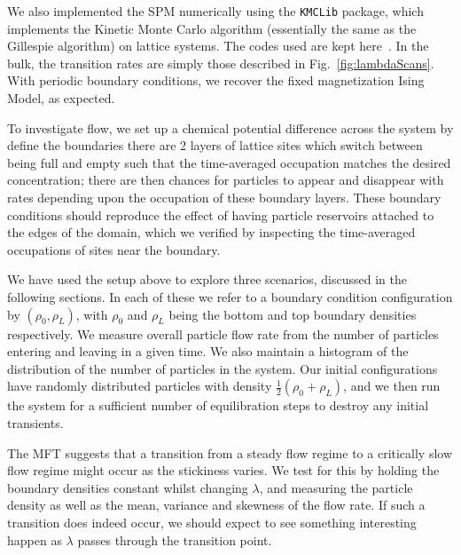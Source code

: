 \documentclass[
reprint,
 amsmath,amssymb,
 aps,
 prl
]{revtex4-1}
\begin{document}
We also implemented the SPM numerically using the \texttt{KMCLib}\cite{leetmaa2014kmclib} package, which implements the Kinetic Monte Carlo algorithm
(essentially the same as the Gillespie algorithm\cite{Gillespie1977, Bortz1975, Prados1997})
on lattice systems. The codes used are kept here~\cite{jHellGitRepo}.
 In the bulk, the transition rates are simply those described in Fig.~\ref{fig:lambdaScans}. 
With periodic boundary conditions, we recover the fixed magnetization Ising Model, as expected.

To investigate flow, we set up a chemical potential difference across the system by 
define the boundaries there are 2 layers of
lattice sites which switch between being full and empty such
that the time-averaged occupation matches the
desired concentration; there are then chances for particles to
appear and disappear with rates depending upon the occupation of these
boundary layers. These boundary conditions
should reproduce the effect of having particle reservoirs attached to
the edges of the domain, which we verified by
inspecting the time-averaged occupations of sites near the boundary.

We have used the setup above to explore three scenarios, discussed in
the following sections. In each of these we refer to a boundary
condition configuration by $(\rho_0, \rho_L)$, with $\rho_0$ and
$\rho_L$ being the bottom and top boundary densities respectively.
We measure overall particle flow rate from the number of
particles entering and leaving in a given time.
We also maintain a histogram of the distribution of the number of particles in
the system.  Our initial configurations have randomly
distributed particles with density $\frac{1}{2}(\rho_0 + \rho_L)$, and
we then run the system for a sufficient number of equilibration steps to
destroy any initial transients.

The MFT suggests that a transition from a steady flow regime to a
critically slow flow regime might occur as the stickiness varies.  We
test for this by holding the boundary densities constant whilst changing
$\lambda$, and measuring the particle density as well as the mean,
variance and skewness of the flow rate. If such a transition does
indeed occur, we should expect to see something interesting happen as
$\lambda$ passes through the transition point. 
\end{document}
